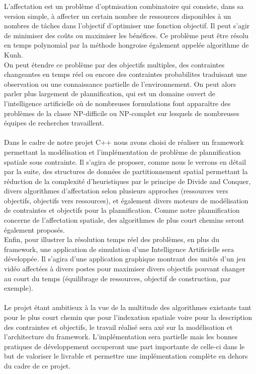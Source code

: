 L'affectation est un problème d'optmisation combinatoire qui consiste, dans sa version simple, à affecter un certain nombre de ressources disponibles à un nombres de tâches dans l'objectif d'optimiser une fonction objectif. Il peut s'agir de minimiser des coûts ou maximiser les bénéfices. Ce problème peut être résolu en temps polynomial par la méthode hongroise également appelée algorithme de Kunh.\\
On peut étendre ce problème par des objectifs multiples, des contraintes changeantes en temps réel ou encore des contraintes probabilites traduisant une observation ou une connaissance partielle de l'environnement. On peut alors parler plus largement de plannification, qui est un domaine ouvert de l'intelligence artificielle où de nombreuses formulations font apparaître des problèmes de la classe NP-difficile ou NP-complet sur lesquels de nombreuses équipes de recherches travaillent.\\\\

Dans le cadre de notre projet C++ nous avons choisi de réaliser un framework permettant la modélisation et l'implémentation de problème de plannification spatiale sous contrainte. Il s'agira de proposer, comme nous le verrons en détail par la suite, des structures de données de partitionnement spatial permettant la réduction de la complexité d'heuristiques par le principe de Divide and Conquer, divers algorithmes d'affectation selon plusieurs approches (ressources vers objectifs, objectifs vers ressources), et également divers moteurs de modélisation de contraintes et objectifs pour la plannification. Comme notre plannification concerne de l'affectation spatiale, des algorithmes de plus court chemins seront également proposés.\\
Enfin, pour illustrer la résolution temps réel des problèmes, en plus du framework, une application de simulation d'une Intelligence Artificielle sera développée. Il s'agira d'une application graphique montrant des unités d'un jeu vidéo affectées à divers postes pour maximiser divers objectifs pouvant changer au court du temps (équilibrage de ressources, objectif de construction, par exemple).\\\\

Le projet étant ambitieux à la vue de la multitude des algorithmes existants tant pour le plus court chemin que pour l'indexation spatiale voire pour la description des contraintes et objectifs, le travail réalisé sera axé sur la modélisation et l'architecture du framework. L'implémentation sera partielle mais les bonnes pratiques de développement occuperont une part importante de celle-ci dans le but de valoriser le livrable et permettre une implémentation complète en dehors du cadre de ce projet.\\\\

